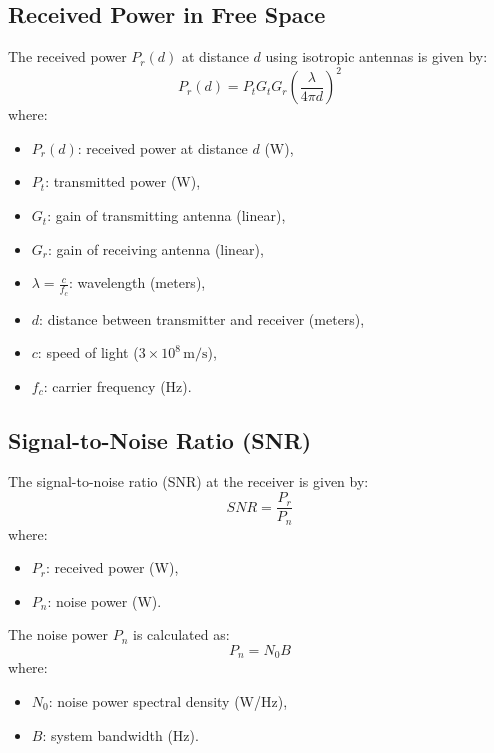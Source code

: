 \documentclass[a4paper,12pt]{book}
\begin{document}
	\subsection{Received Power in Free Space}
	The received power \(P_r(d)\) at distance \(d\) using isotropic antennas is given by:
	\[
	P_r(d) = P_t G_t G_r \left( \frac{\lambda}{4 \pi d} \right)^2
	\]
	where:
	\begin{itemize}
		\item \( P_r(d) \): received power at distance \( d \) (W),
		\item \( P_t \): transmitted power (W),
		\item \( G_t \): gain of transmitting antenna (linear),
		\item \( G_r \): gain of receiving antenna (linear),
		\item \( \lambda = \frac{c}{f_c} \): wavelength (meters),
		\item \( d \): distance between transmitter and receiver (meters),
		\item \( c \): speed of light (\( 3 \times 10^8 \, \text{m/s} \)),
		\item \( f_c \): carrier frequency (Hz).
	\end{itemize}
	
	\subsection{Signal-to-Noise Ratio (SNR)}
	The signal-to-noise ratio (SNR) at the receiver is given by:
	\[
	SNR = \frac{P_r}{P_n}
	\]
	where:
	\begin{itemize}
		\item \( P_r \): received power (W),
		\item \( P_n \): noise power (W).
	\end{itemize}
	
	The noise power \( P_n \) is calculated as:
	\[
	P_n = N_0 B
	\]
	where:
	\begin{itemize}
		\item \( N_0 \): noise power spectral density (W/Hz),
		\item \( B \): system bandwidth (Hz).
	\end{itemize}
	
\end{document}
